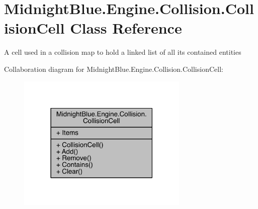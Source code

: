 \hypertarget{class_midnight_blue_1_1_engine_1_1_collision_1_1_collision_cell}{}\section{Midnight\+Blue.\+Engine.\+Collision.\+Collision\+Cell Class Reference}
\label{class_midnight_blue_1_1_engine_1_1_collision_1_1_collision_cell}


A cell used in a collision map to hold a linked list of all its contained entities  




Collaboration diagram for Midnight\+Blue.\+Engine.\+Collision.\+Collision\+Cell\+:
\nopagebreak
\begin{figure}[H]
\begin{center}
\leavevmode
\includegraphics[width=231pt]{class_midnight_blue_1_1_engine_1_1_collision_1_1_collision_cell__coll__graph}
\end{center}
\end{figure}
